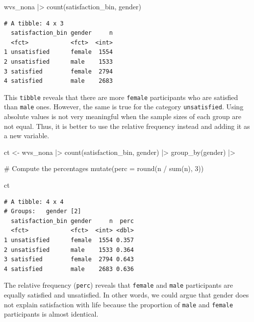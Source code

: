 \documentclass[
  letterpaper,
  DIV=11,
  numbers=noendperiod]{scrreprt}
\newenvironment{Shaded}{\begin{snugshade}}{\end{snugshade}}
\newcommand{\AttributeTok}[1]{\textcolor[rgb]{0.40,0.45,0.13}{#1}}
\newcommand{\CommentTok}[1]{\textcolor[rgb]{0.37,0.37,0.37}{#1}}
\newcommand{\DecValTok}[1]{\textcolor[rgb]{0.68,0.00,0.00}{#1}}
\newcommand{\FunctionTok}[1]{\textcolor[rgb]{0.28,0.35,0.67}{#1}}
\newcommand{\NormalTok}[1]{\textcolor[rgb]{0.00,0.23,0.31}{#1}}
\newcommand{\OtherTok}[1]{\textcolor[rgb]{0.00,0.23,0.31}{#1}}
\newcommand{\SpecialCharTok}[1]{\textcolor[rgb]{0.37,0.37,0.37}{#1}}
\begin{document}
\begin{Shaded}
\begin{Highlighting}[]
\NormalTok{wvs\_nona }\SpecialCharTok{|\textgreater{}} \FunctionTok{count}\NormalTok{(satisfaction\_bin, gender)}
\end{Highlighting}
\end{Shaded}

\begin{verbatim}
# A tibble: 4 x 3
  satisfaction_bin gender     n
  <fct>            <fct>  <int>
1 unsatisfied      female  1554
2 unsatisfied      male    1533
3 satisfied        female  2794
4 satisfied        male    2683
\end{verbatim}

This \texttt{tibble} reveals that there are more \texttt{female}
participants who are satisfied than \texttt{male} ones. However, the
same is true for the category \texttt{unsatisfied}. Using absolute
values is not very meaningful when the sample sizes of each group are
not equal. Thus, it is better to use the relative frequency instead and
adding it as a new variable.

\begin{Shaded}
\begin{Highlighting}[]
\NormalTok{ct }\OtherTok{\textless{}{-}}
\NormalTok{  wvs\_nona }\SpecialCharTok{|\textgreater{}}
  \FunctionTok{count}\NormalTok{(satisfaction\_bin, gender) }\SpecialCharTok{|\textgreater{}}
  \FunctionTok{group\_by}\NormalTok{(gender) }\SpecialCharTok{|\textgreater{}}
  
  \CommentTok{\# Compute the percentages}
  \FunctionTok{mutate}\NormalTok{(}\AttributeTok{perc =} \FunctionTok{round}\NormalTok{(n }\SpecialCharTok{/} \FunctionTok{sum}\NormalTok{(n), }\DecValTok{3}\NormalTok{))}

\NormalTok{ct}
\end{Highlighting}
\end{Shaded}

\begin{verbatim}
# A tibble: 4 x 4
# Groups:   gender [2]
  satisfaction_bin gender     n  perc
  <fct>            <fct>  <int> <dbl>
1 unsatisfied      female  1554 0.357
2 unsatisfied      male    1533 0.364
3 satisfied        female  2794 0.643
4 satisfied        male    2683 0.636
\end{verbatim}

The relative frequency (\texttt{perc}) reveals that \texttt{female} and
\texttt{male} participants are equally satisfied and unsatisfied. In
other words, we could argue that gender does not explain satisfaction
with life because the proportion of \texttt{male} and \texttt{female}
participants is almost identical.
\end{document}
